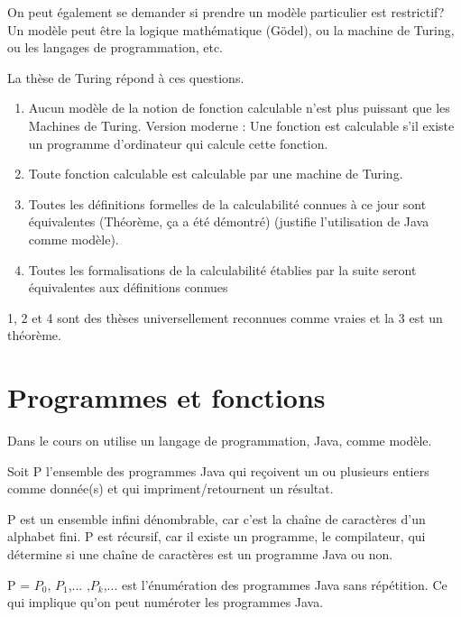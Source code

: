 On peut également se demander si prendre un modèle particulier est restrictif? Un modèle peut être la logique mathématique (Gödel), ou la machine de Turing, ou les langages de programmation, etc.

La thèse de Turing répond à ces questions.
\begin{enumerate}
	\item Aucun modèle de la notion de fonction calculable n'est plus puissant que les Machines de Turing.
		Version moderne : Une fonction est calculable s'il existe un programme d'ordinateur qui calcule cette fonction.
	\item Toute fonction calculable est calculable par une machine de Turing.
	\item Toutes les définitions formelles de la calculabilité connues à ce jour sont équivalentes (Théorème, ça a été démontré) (justifie l'utilisation de Java comme modèle).
	\item Toutes les formalisations de la calculabilité établies par la
		suite seront équivalentes aux définitions connues
\end{enumerate}
1, 2 et 4 sont des thèses universellement reconnues comme vraies et la 3 est un théorème.


\section{Programmes et fonctions}
\label{sec:programmes_et_fonctions}
Dans le cours on utilise un langage de programmation, Java, comme modèle.

\begin{mydef}[P]
	Soit P l'ensemble des programmes Java qui reçoivent un ou plusieurs entiers comme donnée(s) et qui impriment/retournent un résultat.
\end{mydef}

\begin{myprop}
	P est un ensemble infini dénombrable, car c'est la chaîne de caractères d'un alphabet fini. P est récursif, car il existe un programme, le compilateur, qui détermine si une chaîne de caractères est un programme Java ou non.
\end{myprop}

\begin{mydef}[Énumération de P]
	P = $P_0$, $P_1$,... ,$P_k$,... est l'énumération des programmes Java sans répétition. Ce qui implique qu'on peut numéroter les programmes Java.\\
\end{mydef}

